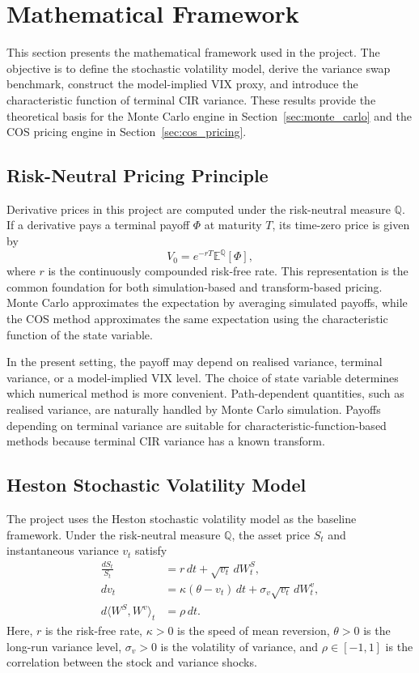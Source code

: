 \section{Mathematical Framework}
\label{sec:theory}

This section presents the mathematical framework used in the project. The objective is to define the stochastic volatility model, derive the variance swap benchmark, construct the model-implied VIX proxy, and introduce the characteristic function of terminal CIR variance. These results provide the theoretical basis for the Monte Carlo engine in Section~\ref{sec:monte_carlo} and the COS pricing engine in Section~\ref{sec:cos_pricing}.

\subsection{Risk-Neutral Pricing Principle}

Derivative prices in this project are computed under the risk-neutral measure \(\mathbb{Q}\). If a derivative pays a terminal payoff \(\Phi\) at maturity \(T\), its time-zero price is given by
\begin{equation}
V_0
=
e^{-rT}
\mathbb{E}^{\mathbb{Q}}
\left[
\Phi
\right],
\end{equation}
where \(r\) is the continuously compounded risk-free rate. This representation is the common foundation for both simulation-based and transform-based pricing. Monte Carlo approximates the expectation by averaging simulated payoffs, while the COS method approximates the same expectation using the characteristic function of the state variable.

In the present setting, the payoff may depend on realised variance, terminal variance, or a model-implied VIX level. The choice of state variable determines which numerical method is more convenient. Path-dependent quantities, such as realised variance, are naturally handled by Monte Carlo simulation. Payoffs depending on terminal variance are suitable for characteristic-function-based methods because terminal CIR variance has a known transform.

\subsection{Heston Stochastic Volatility Model}

The project uses the Heston stochastic volatility model as the baseline framework. Under the risk-neutral measure \(\mathbb{Q}\), the asset price \(S_t\) and instantaneous variance \(v_t\) satisfy
\begin{align}
\frac{dS_t}{S_t}
&=
r\,dt+\sqrt{v_t}\,dW_t^S, \label{eq:heston_stock}\\
dv_t
&=
\kappa(\theta-v_t)\,dt+\sigma_v\sqrt{v_t}\,dW_t^v, \label{eq:heston_variance}\\
d\langle W^S,W^v\rangle_t
&=
\rho\,dt. \label{eq:heston_corr}
\end{align}
Here, \(r\) is the risk-free rate, \(\kappa>0\) is the speed of mean reversion, \(\theta>0\) is the long-run variance level, \(\sigma_v>0\) is the volatility of variance, and \(\rho\in[-1,1]\) is the correlation between the stock and variance shocks.

